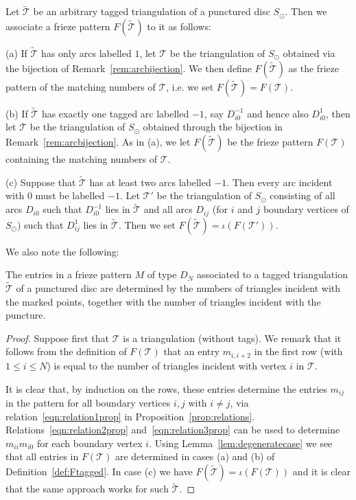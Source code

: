 \documentclass[a4paper]{amsart}
\begin{document}
\begin{definition} \label{def:Ftagged}
Let $\widetilde{\mathcal T}$ be an arbitrary tagged triangulation of a
punctured disc $S_{\odot}$. 
Then we associate a frieze pattern $F(\widetilde{\mathcal T})$ to it
as follows:

(a) If $\widetilde{\mathcal T}$ has only arcs labelled $1$, let ${\mathcal T}$ be the triangulation
of $S_{\odot}$ obtained via the bijection of Remark~\ref{rem:arcbijection}. We
then define $F(\widetilde{\mathcal T})$ as the frieze pattern of the
matching numbers of ${\mathcal T}$, i.e. we set $F(\widetilde{\mathcal T})=F({\mathcal T})$.

(b) If $\widetilde{\mathcal T}$ has exactly one tagged arc labelled $-1$, say $D_{i0}^{-1}$ and
hence also $D_{i0}^1$, then let ${\mathcal T}$ be the triangulation of $S_{\odot}$
obtained through the bijection in Remark~\ref{rem:arcbijection}. As in (a),
we let $F(\widetilde{\mathcal T})$ be the frieze pattern $F({\mathcal T})$ containing the
matching numbers of ${\mathcal T}$.

(c) Suppose that $\widetilde{\mathcal T}$ has at least two arcs labelled $-1$.
Then every arc incident with $0$ must be labelled $-1$.
Let ${\mathcal T}'$ be the triangulation of $S_{\odot}$ consisting of all
arcs $D_{i0}$ such that $D_{i0}^{-1}$ lies in $\widetilde{\mathcal T}$ and all
arcs $D_{ij}$ (for $i$ and $j$ boundary vertices of $S_{\odot}$) such that
$D_{ij}^1$ lies in $\widetilde{\mathcal T}$.
Then we set $F(\widetilde{\mathcal T})=\iota (F({\mathcal T}'))$.
\end{definition}

We also note the following:

\begin{prop}
The entries in a frieze pattern $M$ of type $D_N$ associated to a
tagged triangulation $\widetilde{\mathcal T}$ of a punctured disc are determined by
the numbers of triangles incident with the marked points, together with the
number of triangles incident with the puncture.
\end{prop}

\begin{proof}
Suppose first that ${\mathcal T}$ is a triangulation (without tags).
We remark that it follows from the definition of $F({\mathcal T})$ that
an entry $m_{i,i+2}$ in the first row (with $1\leq i\leq N$) is equal to
the number of triangles incident with vertex $i$ in ${\mathcal T}$. 

It is clear that,
by induction on the rows, these entries determine the entries
$m_{ij}$ in the pattern for all boundary vertices $i,j$ with $i\not=j$, via
relation~\eqref{eqn:relation1prop} in Proposition~\ref{prop:relations}.
Relations~\eqref{eqn:relation2prop} and~\eqref{eqn:relation3prop} can be used
to determine $m_{ii}m_{i0}$ for each boundary vertex $i$.
Using Lemma~\ref{lem:degeneratecase} we see that all entries in $F({\mathcal T})$
are determined in cases (a) and (b) of Definition~\ref{def:Ftagged}.
In case (c) we have $F(\widetilde{\mathcal T})=\iota (F({\mathcal T}))$ 
and it is clear that the same approach works for such $\widetilde{\mathcal T}$. 
\end{proof}
\end{document}
